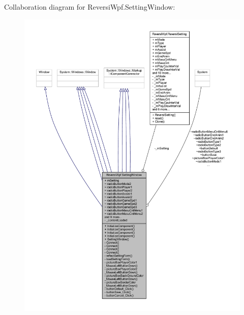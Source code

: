Collaboration diagram for Reversi\+Wpf.\+Setting\+Window\+:\nopagebreak
\begin{figure}[H]
\begin{center}
\leavevmode
\includegraphics[width=350pt]{class_reversi_wpf_1_1_setting_window__coll__graph}
\end{center}
\end{figure}
